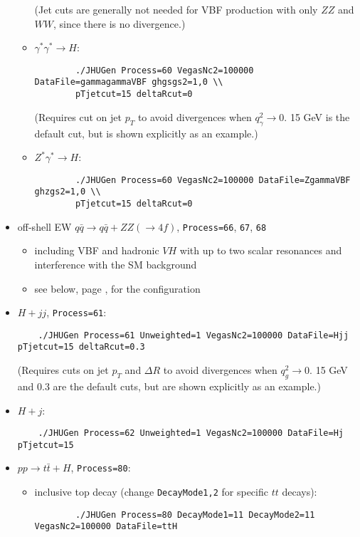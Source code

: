 \documentclass[aps,superscriptaddress,nofootinbib]{revtex4}
\begin{document}
\begin{itemize}
\begin{itemize}
\begin{verbatim}
		\end{verbatim}
		(Jet cuts are generally not needed for VBF production with only $ZZ$ and $WW$, since there is no divergence.)
		\item $\gamma^*\gamma^*\to H$:
		\begin{verbatim}
		./JHUGen Process=60 VegasNc2=100000 DataFile=gammagammaVBF ghgsgs2=1,0 \\
		pTjetcut=15 deltaRcut=0
		\end{verbatim}
		(Requires cut on jet $p_T$ to avoid divergences when $q_\gamma^2\to 0$.  15 GeV is the default cut, but is shown explicitly as an example.)
		\item $Z^*\gamma^*\to H$:
		\begin{verbatim}
		./JHUGen Process=60 VegasNc2=100000 DataFile=ZgammaVBF ghzgs2=1,0 \\
		pTjetcut=15 deltaRcut=0
		\end{verbatim}
	\end{itemize}
	\item off-shell EW $q \bar{q} \to q \bar{q} + ZZ(\to 4f)$, \texttt{Process=66}, \texttt{67}, \texttt{68} 
	\begin{itemize}
		\item including VBF and hadronic $VH$ with up to two scalar resonances and interference with the SM background
		\item see below, page \pageref{sec:offshell}, for the configuration
	\end{itemize}
	\item $H+jj$, \texttt{Process=61}:
	\begin{verbatim}
	./JHUGen Process=61 Unweighted=1 VegasNc2=100000 DataFile=Hjj pTjetcut=15 deltaRcut=0.3
	\end{verbatim}
	(Requires cuts on jet $p_T$ and $\Delta R$ to avoid divergences when $q_g^2\to 0$.  15 GeV and 0.3 are the default cuts, but are shown explicitly as an example.)
	\item $H+j$:
	\begin{verbatim}
	./JHUGen Process=62 Unweighted=1 VegasNc2=100000 DataFile=Hj pTjetcut=15
	\end{verbatim}
	\item $pp \to t\bar{t}+H$, \texttt{Process=80}:
	\begin{itemize}
		\item inclusive top decay (change \verb|DecayMode1,2| for specific $tt$ decays):
		\begin{verbatim}
		./JHUGen Process=80 DecayMode1=11 DecayMode2=11 VegasNc2=100000 DataFile=ttH

\end{verbatim}
\end{itemize}
\end{itemize}
\end{document}
